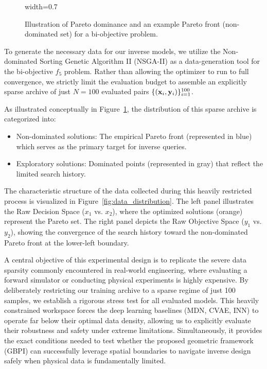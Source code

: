 \begin{figure}[!htbp]
  \centering
  \begin{adjustbox}{width=0.7\linewidth}
      
  \end{adjustbox}
  \caption[Pareto Dominance and Bi-Objective Pareto Front]{Illustration of Pareto dominance and an example Pareto front (non-dominated set) for a bi-objective problem.}
  \label{fig:pareto_front}
\end{figure}

To generate the necessary data for our inverse models, we utilize the Non-dominated Sorting Genetic Algorithm II (NSGA-II) as a data-generation tool for the bi-objective $f_5$ problem. Rather than allowing the optimizer to run to full convergence, we strictly limit the evaluation budget to assemble an explicitly sparse archive of just $N=100$ evaluated pairs $\{(\mathbf{x}_i,\mathbf{y}_i)\}_{i=1}^{100}$. 

As illustrated conceptually in Figure~\ref{fig:pareto_front}, the distribution of this sparse archive is categorized into:
\begin{itemize}
    \item Non-dominated solutions: The empirical Pareto front (represented in blue) which serves as the primary target for inverse queries.
    \item Exploratory solutions: Dominated points (represented in gray) that reflect the limited search history.
\end{itemize}

The characteristic structure of the data collected during this heavily restricted process is visualized in Figure~\ref{fig:data_distribution}. The left panel illustrates the Raw Decision Space ($x_1$ vs. $x_2$), where the optimized solutions (orange) represent the Pareto set. The right panel depicts the Raw Objective Space ($y_1$ vs. $y_2$), showing the convergence of the search history toward the non-dominated Pareto front at the lower-left boundary.

A central objective of this experimental design is to replicate the severe data sparsity commonly encountered in real-world engineering, where evaluating a forward simulator or conducting physical experiments is highly expensive. By deliberately restricting our training archive to a sparse regime of just 100 samples, we establish a rigorous stress test for all evaluated models. This heavily constrained workspace forces the deep learning baselines (MDN, CVAE, INN) to operate far below their optimal data density, allowing us to explicitly evaluate their robustness and safety under extreme limitations. Simultaneously, it provides the exact conditions needed to test whether the proposed geometric framework (GBPI) can successfully leverage spatial boundaries to navigate inverse design safely when physical data is fundamentally limited.


